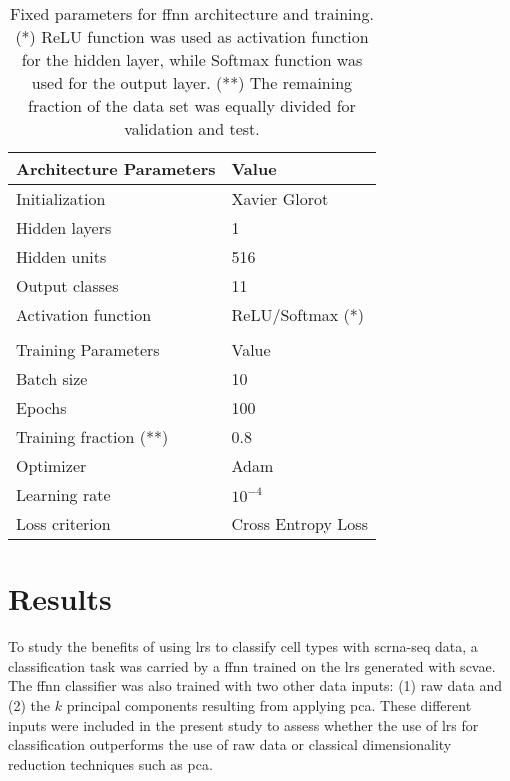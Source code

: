 \documentclass{article}
\begin{document}
\begin{table}[htp]
\caption{\small{Fixed parameters for \gls{ffnn} architecture and training. (*) ReLU function was used as activation function for the hidden layer, while Softmax function was used for the output layer. (**) The remaining fraction of the data set was equally divided for validation and test.}}
\vspace{0.25cm}
\small
\centering
\begin{tabular}{ll}
\hline
Architecture Parameters    & Value        \\
\hline
Initialization    & Xavier Glorot                 \\
Hidden layers & 1             \\
Hidden units     & 516                \\
Output classes     & 11               \\
Activation function     & ReLU/Softmax (*)                \\
& \\
\hline
Training Parameters    & Value        \\
\hline
Batch size    & 10                 \\
Epochs     & 100                \\
Training fraction (**)    & 0.8                \\
Optimizer     & Adam               \\
Learning rate & $10^{-4}$             \\
Loss criterion     & Cross Entropy Loss \\
\hline
\end{tabular}
\label{tab:ffnn_fixed}
\end{table}


\section{Results}
\label{sec:results}

\noindent To study the benefits of using \glspl{lr} to classify cell types with \gls{scrna-seq} data, a classification task was carried by a \gls{ffnn} trained on the \glspl{lr} generated with \gls{scvae}.
The \gls{ffnn} classifier was also trained with two other data inputs: (1) raw data and (2) the $k$ principal components resulting from applying \gls{pca}.
These different inputs were included in the present study to assess whether the use of \glspl{lr} for classification outperforms the use of raw data or classical dimensionality reduction techniques such as \gls{pca}.
\end{document}
